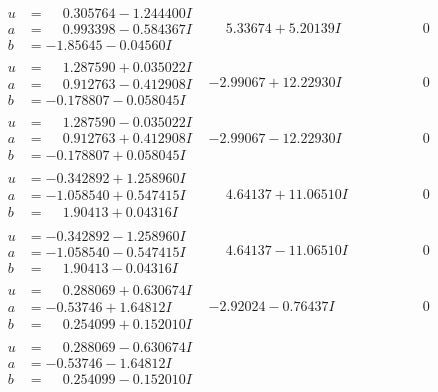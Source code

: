 \documentclass[1p]{elsarticle_modified}
\theoremstyle{definition}
\begin{document}
$$\begin{array}{c|c|c}
\begin{aligned}
u &= \phantom{-}0.305764 - 1.244400 I \\
a &= \phantom{-}0.993398 - 0.584367 I \\
b &= -1.85645 - 0.04560 I\end{aligned}
 & \phantom{-}5.33674 + 5.20139 I & \phantom{-0.000000 } 0 \\ \hline\begin{aligned}
u &= \phantom{-}1.287590 + 0.035022 I \\
a &= \phantom{-}0.912763 - 0.412908 I \\
b &= -0.178807 - 0.058045 I\end{aligned}
 & -2.99067 + 12.22930 I & \phantom{-0.000000 } 0 \\ \hline\begin{aligned}
u &= \phantom{-}1.287590 - 0.035022 I \\
a &= \phantom{-}0.912763 + 0.412908 I \\
b &= -0.178807 + 0.058045 I\end{aligned}
 & -2.99067 - 12.22930 I & \phantom{-0.000000 } 0 \\ \hline\begin{aligned}
u &= -0.342892 + 1.258960 I \\
a &= -1.058540 + 0.547415 I \\
b &= \phantom{-}1.90413 + 0.04316 I\end{aligned}
 & \phantom{-}4.64137 + 11.06510 I & \phantom{-0.000000 } 0 \\ \hline\begin{aligned}
u &= -0.342892 - 1.258960 I \\
a &= -1.058540 - 0.547415 I \\
b &= \phantom{-}1.90413 - 0.04316 I\end{aligned}
 & \phantom{-}4.64137 - 11.06510 I & \phantom{-0.000000 } 0 \\ \hline\begin{aligned}
u &= \phantom{-}0.288069 + 0.630674 I \\
a &= -0.53746 + 1.64812 I \\
b &= \phantom{-}0.254099 + 0.152010 I\end{aligned}
 & -2.92024 - 0.76437 I & \phantom{-0.000000 } 0 \\ \hline\begin{aligned}
u &= \phantom{-}0.288069 - 0.630674 I \\
a &= -0.53746 - 1.64812 I \\
b &= \phantom{-}0.254099 - 0.152010 I\end{aligned}

\end{array}$$
\end{document}
